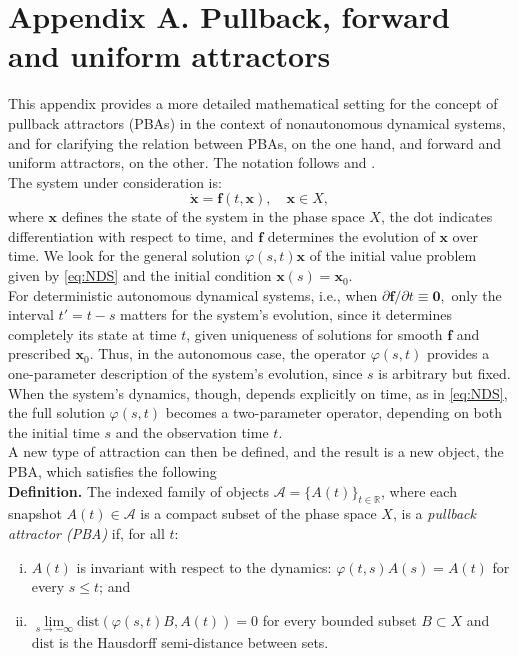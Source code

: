 \documentclass[%
 aip, cha,
 amsmath,amssymb,
 reprint,%
author-year,%
]{revtex4-1}
\newcommand{\f}{\mathbf f}
\newcommand{\x}{\mathbf x}
\newcommand{\0}{\mathbf 0}
\begin{document}
\section*{Appendix A. Pullback, forward and uniform attractors}
\label{app:appendix}
This appendix provides a more detailed mathematical setting for the concept of pullback attractors (PBAs) in the context of nonautonomous dynamical systems, and for clarifying the relation between PBAs, on the one hand, and forward and uniform attractors, on the other. The notation follows \cite{ghil_PBA} and \cite{charo}. \\
The system under consideration is:
\begin{equation}
    \dot{\mathbf{x}}=\mathbf{f}(t, \mathbf{x}), \quad \x \in X,  \tag{A1}
    \label{eq:NDS}
\end{equation}
where $\mathbf{x}$ defines the state of the system in the phase space $X$, the dot indicates differentiation with respect to time, and $\mathbf{f}$ determines the evolution of $\x$ over time. We look for the general solution $\varphi(s,t)\mathbf{x}$ of the initial value problem given by \eqref{eq:NDS} and the initial condition $\mathbf{x}(s) = \mathbf{x}_0$. \\
For deterministic autonomous dynamical systems, i.e., when $\partial \f/\partial t \equiv \0,$ only the interval $t' = t-s$ matters for the system's evolution, since it determines completely its state at time $t$, given uniqueness of solutions for smooth $\f$ and prescribed $\x_0$. Thus, in the autonomous case, the operator $\varphi(s,t)$ provides a one-parameter description of the system's evolution,
since $s$ is arbitrary but fixed.
When the system's dynamics, though, depends explicitly on time, as in \eqref{eq:NDS}, the full solution $\varphi(s,t)$ becomes a two-parameter operator, depending on both the initial time $s$ and the observation time $t$. \\
A new type of attraction can then be defined, and the result is a new object, the PBA, which satisfies the following \\
{\bf Definition.} The indexed family of objects $\mathcal{A}=\{A(t)\}_{t\in \mathbb{R}}$, where each snapshot $A(t) \in \mathcal{A}$ is a compact subset of the phase space $X$, is a {\em pullback attractor (PBA)} if, for all $t$:
\begin{enumerate}[(i), nosep]
    \item $A(t)$ is invariant with respect to the dynamics: $\varphi (t,s) A(s)=A(t)$ for every $s\leq t$; and
    \item $\lim\limits_{s \to -\infty} \text{dist}(\varphi(s, t)B, A(t)) = 0$ for every bounded subset $B \subset X$ and $\text{dist}$ is the Hausdorff semi-distance between sets.
\end{enumerate} 
\end{document}

